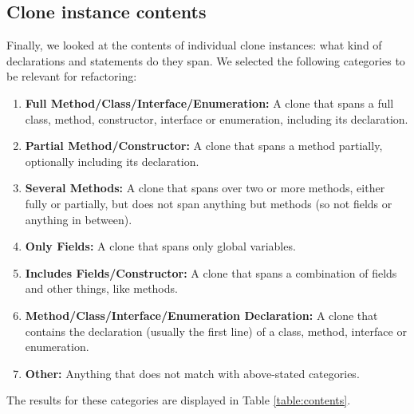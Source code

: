 \documentclass[a4paper]{article}
\begin{document}
\subsection{Clone instance contents}\label{chap:clonecontents}
Finally, we looked at the contents of individual clone instances: what kind of declarations and statements do they span. We selected the following categories to be relevant for refactoring:
\begin{enumerate}
  \item \textbf{Full Method/Class/Interface/Enumeration:} A clone that spans a full class, method, constructor, interface or enumeration, including its declaration.
  \item \textbf{Partial Method/Constructor:} A clone that spans a method partially, optionally including its declaration.
  \item \textbf{Several Methods:} A clone that spans over two or more methods, either fully or partially, but does not span anything but methods (so not fields or anything in between).
  \item \textbf{Only Fields:} A clone that spans only global variables.
  \item \textbf{Includes Fields/Constructor:} A clone that spans a combination of fields and other things, like methods.
  \item \textbf{Method/Class/Interface/Enumeration Declaration:} A clone that contains the declaration (usually the first line) of a class, method, interface or enumeration.
  \item \textbf{Other:} Anything that does not match with above-stated categories.
\end{enumerate}

The results for these categories are displayed in Table \ref{table:contents}.
\end{document}
